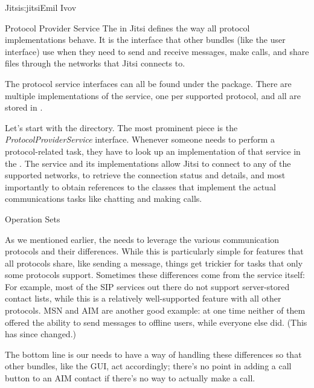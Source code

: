 \begin{aosachapter}{Jitsi}{s:jitsi}{Emil Ivov}
\begin{aosasect1}{Protocol Provider Service}
The  in Jitsi defines the way all
protocol implementations behave. It is the interface that other
bundles (like the user interface) use when they need to send and
receive messages, make calls, and share files through the networks
that Jitsi connects to.

The protocol service interfaces can all be found under the
 package.  There are
multiple implementations of the service, one per supported protocol,
and all are stored in
.

Let's start with the  directory. The most
prominent piece is the \emph{ProtocolProviderService} interface.
Whenever someone needs to perform a protocol-related task, they have
to look up an implementation of that service in the
. The service and its implementations allow Jitsi
to connect to any of the supported networks, to retrieve the connection
status and details, and most importantly to obtain references to the
classes that implement the actual communications tasks like chatting
and making calls.

\begin{aosasect2}{Operation Sets}

As we mentioned earlier, the  needs to
leverage the various communication protocols and their
differences. While this is particularly simple for features that all
protocols share, like sending a message, things get trickier for tasks
that only some protocols support. Sometimes these differences come
from the service itself: For example, most of the SIP services out
there do not support server-stored contact lists, while this is a
relatively well-supported feature with all other protocols. MSN and
AIM are another good example: at one time neither of them offered the
ability to send messages to offline users, while everyone else
did. (This has since changed.)

The bottom line is our  needs to have a
way of handling these differences so that other bundles, like the GUI,
act accordingly; there's no point in adding a call button to an AIM
contact if there's no way to actually make a call.


\end{aosasect2}
\end{aosasect1}
\end{aosachapter}
